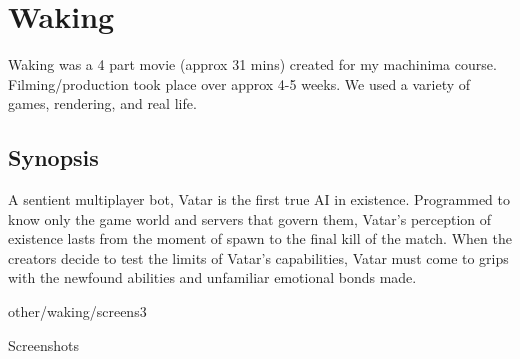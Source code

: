 \section{Waking}
\label{works:waking}

Waking was a 4 part movie (approx 31 mins) created for my machinima
course. Filming/production took place over approx 4-5 weeks. We used a
variety of games, rendering, and real life.

\subsection*{Synopsis}
A sentient multiplayer bot, Vatar is the first true AI in existence.
Programmed to know only the game world and servers that govern them,
Vatar's perception of existence lasts from the moment of spawn to the
final kill of the match. When the creators decide to test the limits
of Vatar's capabilities, Vatar must come to grips with the newfound
abilities and unfamiliar emotional bonds made.



\begin{images}{other/waking/screens}{3}{\textwidth}
    \caption{Screenshots}
    \centering
\end{images}
